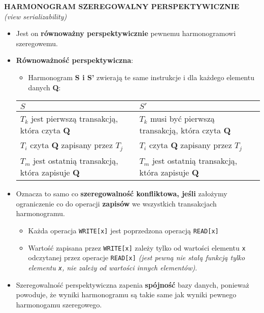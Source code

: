 \textbf{HARMONOGRAM SZEREGOWALNY PERSPEKTYWICZNIE}\\
\textit{(view serializability)}
\begin{itemize}
    \item Jest on \textbf{równoważny perspektywicznie} pewnemu
    harmonogramowi szeregowemu.
    \item \textbf{Równoważność perspektywiczna}:
    \begin{itemize}
        \item Harmonogram \textbf{S i S'} zwierają te same instrukcje i dla
        każdego elementu danych \textbf{Q}:
    \end{itemize}

    \begin{adjustbox}{width=\columnwidth,center}
        \begin{tabular}{|l|l|}
            \hline
            $S$ & $S'$ \\
            \hline
            $T_k$ jest pierwszą transakcją, która czyta \textbf{Q} &
            $T_k$ musi być pierwszą transakcją, która czyta \textbf{Q} \\

            $T_i$ czyta \textbf{Q} zapisany przez $T_j$ &
            $T_i$ czyta \textbf{Q} zapisany przez $T_j$\\

            $T_m$ jest ostatnią transakcją, która zapisuje \textbf{Q} &
            $T_m$ jest ostatnią transakcją, która zapisuje \textbf{Q}\\
            \hline
        \end{tabular}
    \end{adjustbox}

    \item Oznacza to samo co \textbf{szeregowalność konfliktowa, jeśli}
    założymy ograniczenie co do operacji \textbf{zapisów} we
    wszystkich transakcjach harmonogramu.
    \begin{itemize}
        \item Każda operacja \texttt{WRITE[x]} jest poprzedzona operacją
        \texttt{READ[x]}
        \item Wartość zapisana przez \texttt{WRITE[x]} zależy tylko od
        wartości elementu \texttt{x} odczytanej przez operacje
        \texttt{READ[x]} \textit{(jest pewną nie stałą funkcją tylko elementu
        \texttt{x}, nie zależy od wartości innych elementów)}.
    \end{itemize}

    \item Szeregowalność perspektywiczna zapenia \textbf{spójność} bazy
    danych, ponieważ powoduje, że wyniki harmonogramu są takie same
    jak wyniki pewnego harmonogamu szeregowego.
\end{itemize}

